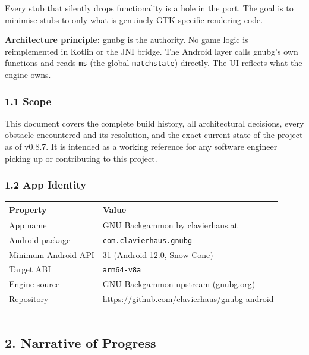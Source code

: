 \documentclass[11pt,a4paper]{article}
\begin{document}
Every stub that silently drops functionality is a hole in the port. The
goal is to minimise stubs to only what is genuinely GTK-specific
rendering code.

\textbf{Architecture principle:} gnubg is the authority. No game logic
is reimplemented in Kotlin or the JNI bridge. The Android layer calls
gnubg's own functions and reads \texttt{ms} (the global \texttt{matchstate})
directly. The UI reflects what the engine owns.

\subsubsection{1.1 Scope}\label{scope}

This document covers the complete build history, all architectural
decisions, every obstacle encountered and its resolution, and the exact
current state of the project as of v0.8.7. It is intended as a working
reference for any software engineer picking up or contributing to this
project.

\subsubsection{1.2 App Identity}\label{app-identity}

\begin{longtable}[]{@{}ll@{}}
\toprule\noalign{}
Property & Value \\
\midrule\noalign{}
\endhead
\bottomrule\noalign{}
\endlastfoot
App name & GNU Backgammon by clavierhaus.at \\
Android package & \texttt{com.clavierhaus.gnubg} \\
Minimum Android API & 31 (Android 12.0, Snow Cone) \\
Target ABI & \texttt{arm64-v8a} \\
Engine source & GNU Backgammon upstream (gnubg.org) \\
Repository & https://github.com/clavierhaus/gnubg-android \\
\end{longtable}

\begin{center}\rule{0.5\linewidth}{0.5pt}\end{center}

\subsection{2. Narrative of Progress}\label{narrative-of-progress}
\end{document}
